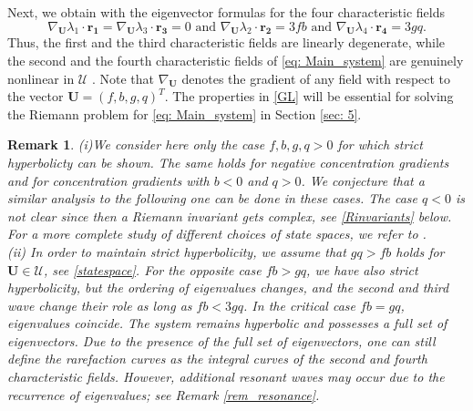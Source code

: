 \documentclass[11pt]{article}
\numberwithin{equation}{section}
\newtheorem{counter example}[theorem]{Counter Example}
\newtheorem{remark}[theorem] {Remark}
\begin{document}
{Next, we obtain with the eigenvector formulas for the four characteristic fields \begin{equation}\label{GL}\nabla_{\mathbf{U}} \lambda_1\cdot\mathbf{r_1}=\nabla_{\mathbf{U}} \lambda_3\cdot\mathbf{r_3}=0 \text{ and } \nabla_{\mathbf{U}} \lambda_2\cdot  \mathbf{r_2}=3fb \text{ and }\nabla_{\mathbf{U}} \lambda_4\cdot  \mathbf{r_4}=3gq. 
\end{equation}
Thus, the first and the third characteristic fields are linearly degenerate, while the second and the fourth characteristic fields of \eqref{eq: Main_system} are genuinely nonlinear in $\mathcal{U}$ \cite{dafermos2005hyperbolic}. Note that $\nabla_{\mathbf{U}}$ denotes the gradient of any field with respect to the vector $\mathbf{U}=(f, b, g, q)^T$. The properties in \eqref{GL} will be essential for solving the Riemann problem for \eqref{eq: Main_system} in Section 
\ref{sec: 5}.
\begin{remark} (i)\label{Rem_hyp}
We consider here only the case $f,b,g,q >0$  for which strict hyperbolicty can be shown. The same holds for negative concentration gradients and for concentration gradients with  $b<0$  and $q>0$. 
We conjecture that a similar analysis to the following one can be done in these cases. The case $q<0$ is not clear since then a Riemann invariant gets complex, see \eqref{Rinvariants} below. For a more complete study of different choices of state spaces, we refer to \cite{barthwal2025generalized}. 
\\
(ii)
In order to maintain strict hyperbolicity, we assume that $gq>fb$ holds for $\mathbf{U} \in \mathcal U$, see \eqref{statespace}. %
For the opposite case $fb>gq$, we have also strict hyperbolicity, but the ordering of eigenvalues changes, and the second and third wave change their role as long as $fb<3gq$. In the critical case $fb=gq$, eigenvalues coincide. The system remains hyperbolic and possesses a full set of eigenvectors. Due to the presence of the full set of eigenvectors, one can still define the rarefaction curves as the integral curves of the second and fourth characteristic fields. However, additional resonant waves may occur due to the recurrence of eigenvalues; see Remark \ref{rem_resonance}. 
\end{remark}
}
\end{document}
